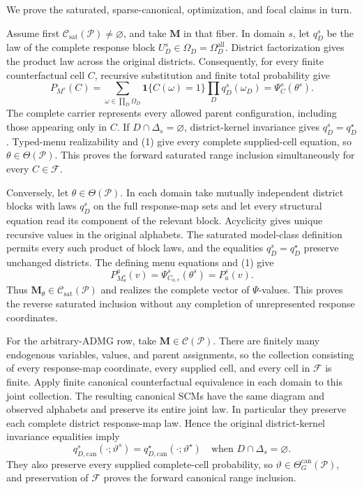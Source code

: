 We prove the saturated, sparse-canonical, optimization, and focal claims in turn.

Assume first \(\mathcal C_{\mathrm{sat}}(\mathcal P)\ne\varnothing\), and take \(\mathbf M\) in that fiber.  In domain \(s\), let \(q_D^s\) be the law of the complete response block \(U_D^s\in\Omega_D=\Omega_D^{\mathrm{all}}\).  District factorization gives the product law across the original districts.  Consequently, for every finite counterfactual cell \(C\), recursive substitution and finite total probability give
\[
P_{M^s}(C)
=\sum_{\omega\in\prod_D\Omega_D}
\mathbf 1\{C(\omega)=1\}\prod_Dq_D^s(\omega_D)
=\Psi_C^s(\theta^s).
\tag{1}
\]
The complete carrier represents every allowed parent configuration, including those appearing only in \(C\).  If \(D\cap\Delta_s=\varnothing\), district-kernel invariance gives \(q_D^s=q_D^\star\).  Typed-menu realizability and (1) give every complete supplied-cell equation, so \(\theta\in\Theta(\mathcal P)\).  This proves the forward saturated range inclusion simultaneously for every \(C\in\mathcal F\).

Conversely, let \(\theta\in\Theta(\mathcal P)\).  In each domain take mutually independent district blocks with laws \(q_D^s\) on the full response-map sets and let every structural equation read its component of the relevant block.  Acyclicity gives unique recursive values in the original alphabets.  The saturated model-class definition permits every such product of block laws, and the equalities \(q_D^s=q_D^\star\) preserve unchanged districts.  The defining menu equations and (1) give
\[
P_{M_\theta^s}^a(v)=\Psi_{C_{a,v}}^s(\theta^s)=P_a^s(v).
\]
Thus \(\mathbf M_\theta\in\mathcal C_{\mathrm{sat}}(\mathcal P)\) and realizes the complete vector of \(\Psi\)-values.  This proves the reverse saturated inclusion without any completion of unrepresented response coordinates.

For the arbitrary-ADMG row, take \(\mathbf M\in\mathcal C(\mathcal P)\).  There are finitely many endogenous variables, values, and parent assignments, so the collection consisting of every response-map coordinate, every supplied cell, and every cell in \(\mathcal F\) is finite.  Apply finite canonical counterfactual equivalence in each domain to this joint collection.  The resulting canonical SCMs have the same diagram and observed alphabets and preserve its entire joint law.  In particular they preserve each complete district response-map law.  Hence the original district-kernel invariance equalities imply
\[
q_{D,\mathrm{can}}^s(\cdot;\vartheta^s)
=q_{D,\mathrm{can}}^\star(\cdot;\vartheta^\star)
\quad\text{when }D\cap\Delta_s=\varnothing.
\tag{2}
\]
They also preserve every supplied complete-cell probability, so \(\vartheta\in\Theta_G^{\mathrm{can}}(\mathcal P)\), and preservation of \(\mathcal F\) proves the forward canonical range inclusion.


